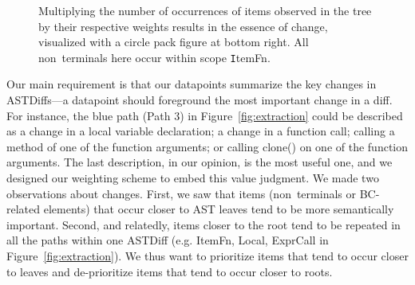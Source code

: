 \begin{figure}[h]
        

    \caption{\label{fig:essence}Multiplying the number of occurrences of items observed in the tree by their respective weights results in the essence of change, visualized with a circle pack figure at bottom right. All non~terminals here occur within scope {\texttt ItemFn}.}
\end{figure}

Our main requirement is that our datapoints summarize the key changes in ASTDiffs---a datapoint should foreground the most important change in a diff. For instance, the blue path (Path 3) in Figure~\ref{fig:extraction} could be described as a change in a local variable declaration; a change in a function call; calling a method of one of the function arguments; or calling clone() on one of the function arguments. The last description, in our opinion, is the most useful one, and we designed our weighting scheme to embed this value judgment.
We made two observations about changes. First, we saw that items (non~terminals or BC-related elements) that occur closer to AST leaves tend to be more semantically important. Second, and relatedly, items closer to the root tend to be repeated in all the paths within one ASTDiff (e.g. ItemFn, Local, ExprCall in Figure~\ref{fig:extraction}). We thus want to prioritize items that tend to occur closer to leaves and de-prioritize items that tend to occur closer to roots.

